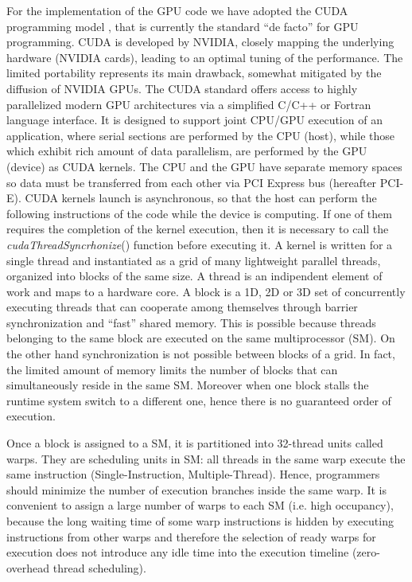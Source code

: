 \documentclass[11pt]{article}
\begin{document}
For the implementation of the GPU code we have adopted the CUDA 
programming model \cite{cudaurl},
that is currently the standard ``de facto'' for GPU programming.
CUDA is developed by NVIDIA, closely mapping the underlying
hardware (NVIDIA cards), leading to an optimal tuning of the performance.
The limited portability represents its main drawback, somewhat mitigated
by the diffusion of NVIDIA GPUs.
The CUDA standard offers access to highly parallelized modern GPU architectures via a simplified C/C++ or Fortran language interface. It is designed to support joint CPU/GPU execution of an application, where serial sections are performed by the CPU (host), while those which exhibit rich amount of data parallelism, are performed by the GPU (device) as CUDA kernels. The CPU and the GPU have separate memory spaces so data must be transferred from each other via PCI Express 
bus (hereafter PCI-E). 
CUDA kernels launch is asynchronous, so that the host can
 perform the following instructions of the code while the device is computing. If one of them requires the completion 
of the kernel execution, then it is necessary to call the \textit{cudaThreadSyncrhonize}() function before executing it.
A kernel is written for a single thread and instantiated as a grid of many lightweight parallel threads, organized into blocks of the same size. A thread is an indipendent element of work and maps to a hardware core. A block is a 1D, 2D or 3D set of concurrently executing threads that can cooperate among themselves through barrier synchronization and ``fast'' shared memory. 
This is possible because threads belonging to the same block are executed on the same multiprocessor (SM). On the other hand
 synchronization is not possible between blocks of a grid. In fact, the limited amount of memory limits the number of 
blocks that can simultaneously reside in the same SM. Moreover when one block stalls the runtime system switch to 
a different one, hence there is no guaranteed order of execution.

Once a block is assigned to a SM, it is partitioned into 32-thread units called warps. They are scheduling units in SM:
all threads in the same warp execute the same instruction (Single-Instruction, Multiple-Thread). Hence, programmers should minimize the number of execution branches inside the same warp. It is convenient to assign a large number of warps to each SM (i.e. high occupancy), because the long waiting time of some warp instructions is hidden by executing instructions from other warps  and therefore the selection of ready warps for execution does not introduce any idle time into the execution timeline (zero-overhead thread scheduling). 
\end{document}
